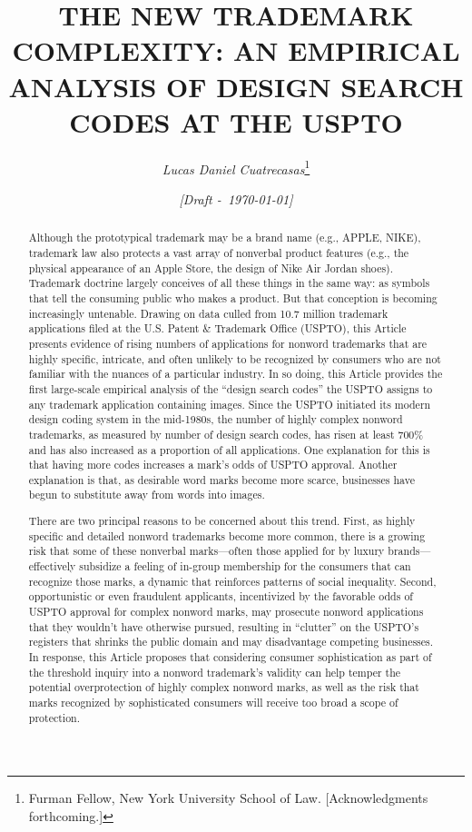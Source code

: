 \documentclass[letterpaper, 11pt, oneside]{article}
\title{\Large{\uppercase{The New Trademark Complexity: An Empirical Analysis of Design Search Codes at the USPTO}}}
\author{\large\textit{Lucas Daniel Cuatrecasas}\thanks{Furman Fellow, New York University School of Law. [Acknowledgments forthcoming.]}}
\date{\textit{\small [Draft -\ \today]}}
\begin{document}
\maketitle\thispagestyle{firstpage}

\begin{abstract}

\begin{itshape}

Although the prototypical trademark may be a brand name (e.g., APPLE, NIKE), trademark law also protects a vast array of nonverbal product features (e.g., the physical appearance of an Apple Store, the design of Nike Air Jordan shoes). Trademark doctrine largely conceives of all these things in the same way: as symbols that tell the consuming public who makes a product. But that conception is becoming increasingly untenable. Drawing on data culled from 10.7 million trademark applications filed at the U.S. Patent \& Trademark Office (USPTO), this Article presents evidence of rising numbers of applications for nonword trademarks that are highly specific, intricate, and often unlikely to be recognized by consumers who are not familiar with the nuances of a particular industry. In so doing, this Article provides the first large-scale empirical analysis of the ``design search codes'' the USPTO assigns to any trademark application containing images. Since the USPTO initiated its modern design coding system in the mid-1980s, the number of highly complex nonword trademarks, as measured by number of design search codes, has risen at least 700\% and has also increased as a proportion of all applications. One explanation for this is that having more codes increases a mark's odds of USPTO approval. Another explanation is that, as desirable word marks become more scarce, businesses have begun to substitute away from words into images.

There are two principal reasons to be concerned about this trend. First, as highly specific and detailed nonword trademarks become more common, there is a growing risk that some of these nonverbal marks—often those applied for by luxury brands—effectively subsidize a feeling of in-group membership for the consumers that can recognize those marks, a dynamic that reinforces patterns of social inequality. Second, opportunistic or even fraudulent applicants, incentivized by the favorable odds of USPTO approval for complex nonword marks, may prosecute nonword applications that they wouldn't have otherwise pursued, resulting in ``clutter'' on the USPTO's registers that shrinks the public domain and may disadvantage competing businesses. In response, this Article proposes that considering consumer sophistication as part of the threshold inquiry into a nonword trademark's validity can help temper the potential overprotection of highly complex nonword marks, as well as the risk that marks recognized by sophisticated consumers will receive too broad a scope of protection.

\end{itshape}

\end{abstract}
\end{document}

